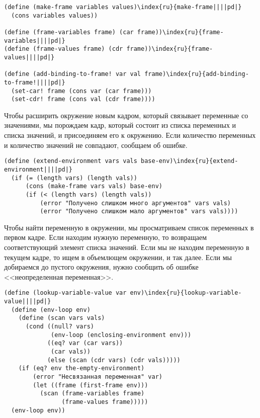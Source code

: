 \begin{Verbatim}[fontsize=\small]
(define (make-frame variables values)\index{ru}{make-frame||||pd|}
  (cons variables values))

(define (frame-variables frame) (car frame))\index{ru}{frame-variables||||pd|}
(define (frame-values frame) (cdr frame))\index{ru}{frame-values||||pd|}

(define (add-binding-to-frame! var val frame)\index{ru}{add-binding-to-frame!||||pd|}
  (set-car! frame (cons var (car frame)))
  (set-cdr! frame (cons val (cdr frame))))
\end{Verbatim}

Чтобы расширить окружение новым кадром, который связывает
переменные со значениями, мы порождаем кадр, который состоит из списка
переменных и списка значений, и присоединяем его к окружению.  Если
количество переменных и количество значений не совпадают, сообщаем
об ошибке.

\begin{Verbatim}[fontsize=\small]
(define (extend-environment vars vals base-env)\index{ru}{extend-environment||||pd|}
  (if (= (length vars) (length vals))
      (cons (make-frame vars vals) base-env)
      (if (< (length vars) (length vals))
          (error "Получено слишком много аргументов" vars vals)
          (error "Получено слишком мало аргументов" vars vals))))
\end{Verbatim}

Чтобы найти переменную в окружении, мы просматриваем
список переменных в первом кадре.  Если находим нужную переменную,
то возвращаем соответствующий элемент списка значений.  Если мы не
находим переменную в текущем кадре, то ищем в объемлющем окружении, и
так далее.  Если мы добираемся до пустого окружения, нужно сообщить об
ошибке <<неопределенная переменная>>.

\begin{Verbatim}[fontsize=\small]
(define (lookup-variable-value var env)\index{ru}{lookup-variable-value||||pd|}
  (define (env-loop env)
    (define (scan vars vals)
      (cond ((null? vars)
             (env-loop (enclosing-environment env)))
            ((eq? var (car vars))
             (car vals))
            (else (scan (cdr vars) (cdr vals)))))
    (if (eq? env the-empty-environment)
        (error "Несвязанная переменная" var)
        (let ((frame (first-frame env)))
          (scan (frame-variables frame)
                (frame-values frame)))))
  (env-loop env))
\end{Verbatim}

